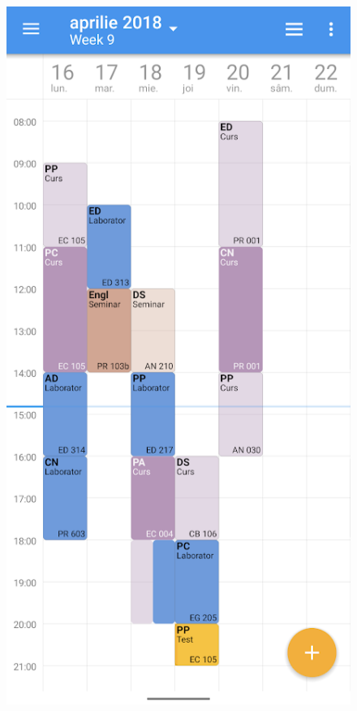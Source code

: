         \begin{figure}[!ht]
            \centering
                \begin{minipage}[b]{0.39\textwidth}
                    \captionsetup{justification=centering}
                    \includegraphics[width=\textwidth]{figures/uni_apps/features/school_assistant_timetable.png}

\end{minipage}
\end{figure}
